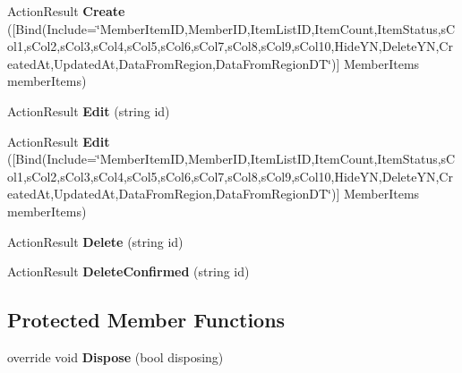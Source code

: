 \begin{DoxyCompactItemize}
\item 
Action\+Result {\bfseries Create} (\mbox{[}Bind(Include=\char`\"{}Member\+Item\+ID,Member\+ID,Item\+List\+ID,Item\+Count,Item\+Status,s\+Col1,s\+Col2,s\+Col3,s\+Col4,s\+Col5,s\+Col6,s\+Col7,s\+Col8,s\+Col9,s\+Col10,Hide\+YN,Delete\+YN,Created\+At,Updated\+At,Data\+From\+Region,Data\+From\+Region\+DT\char`\"{})\mbox{]} Member\+Items member\+Items)\hypertarget{class_cloud_bread_admin_web_1_1_controllers_1_1_member_items_controller_a3926b1870d671dc5ae1f8080fe95b566}{}\label{class_cloud_bread_admin_web_1_1_controllers_1_1_member_items_controller_a3926b1870d671dc5ae1f8080fe95b566}

\item 
Action\+Result {\bfseries Edit} (string id)\hypertarget{class_cloud_bread_admin_web_1_1_controllers_1_1_member_items_controller_a6b36b904da719ef0a29db0248fd1c90b}{}\label{class_cloud_bread_admin_web_1_1_controllers_1_1_member_items_controller_a6b36b904da719ef0a29db0248fd1c90b}

\item 
Action\+Result {\bfseries Edit} (\mbox{[}Bind(Include=\char`\"{}Member\+Item\+ID,Member\+ID,Item\+List\+ID,Item\+Count,Item\+Status,s\+Col1,s\+Col2,s\+Col3,s\+Col4,s\+Col5,s\+Col6,s\+Col7,s\+Col8,s\+Col9,s\+Col10,Hide\+YN,Delete\+YN,Created\+At,Updated\+At,Data\+From\+Region,Data\+From\+Region\+DT\char`\"{})\mbox{]} Member\+Items member\+Items)\hypertarget{class_cloud_bread_admin_web_1_1_controllers_1_1_member_items_controller_ad3896218307a40e31b593458ab502efc}{}\label{class_cloud_bread_admin_web_1_1_controllers_1_1_member_items_controller_ad3896218307a40e31b593458ab502efc}

\item 
Action\+Result {\bfseries Delete} (string id)\hypertarget{class_cloud_bread_admin_web_1_1_controllers_1_1_member_items_controller_ab85321dfeeabb077a878d7ef5f158ffb}{}\label{class_cloud_bread_admin_web_1_1_controllers_1_1_member_items_controller_ab85321dfeeabb077a878d7ef5f158ffb}

\item 
Action\+Result {\bfseries Delete\+Confirmed} (string id)\hypertarget{class_cloud_bread_admin_web_1_1_controllers_1_1_member_items_controller_ae4f8a8d227c0f5b812503387c356951c}{}\label{class_cloud_bread_admin_web_1_1_controllers_1_1_member_items_controller_ae4f8a8d227c0f5b812503387c356951c}

\end{DoxyCompactItemize}
\subsection*{Protected Member Functions}
\begin{DoxyCompactItemize}
\item 
override void {\bfseries Dispose} (bool disposing)\hypertarget{class_cloud_bread_admin_web_1_1_controllers_1_1_member_items_controller_ad8e76166b24fdf2e37d0ceeb4134d2e7}{}\label{class_cloud_bread_admin_web_1_1_controllers_1_1_member_items_controller_ad8e76166b24fdf2e37d0ceeb4134d2e7}

\end{DoxyCompactItemize}


